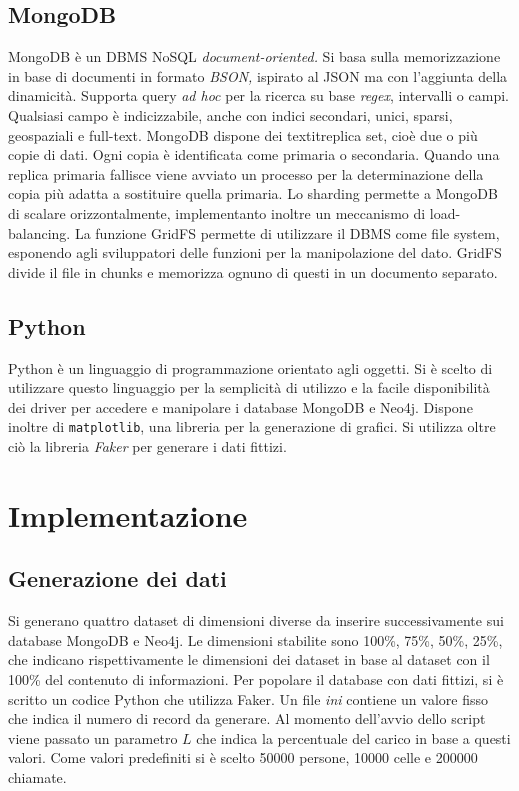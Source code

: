     \vfill

    \subsection{MongoDB}
    MongoDB è un DBMS NoSQL \textit{document-oriented.} Si basa sulla memorizzazione
    in base di documenti in formato \textit{BSON,} ispirato al JSON ma con l'aggiunta
    della dinamicità. Supporta query \textit{ad hoc} per la ricerca su base
    \textit{regex}, intervalli o campi. Qualsiasi campo è indicizzabile, anche
    con indici secondari, unici, sparsi, geospaziali e full-text. MongoDB dispone
    dei textit{replica set,} cioè due o più copie di dati. Ogni copia è identificata come
    primaria o secondaria. Quando una replica primaria fallisce viene avviato un processo
    per la determinazione della copia più adatta a sostituire quella primaria. Lo sharding
    permette a MongoDB di scalare orizzontalmente, implementanto inoltre un
    meccanismo di load-balancing. La funzione GridFS permette di utilizzare il DBMS come file system,
    esponendo agli sviluppatori delle funzioni per la manipolazione del dato. GridFS divide il file
    in chunks e memorizza ognuno di questi in un documento separato.  

    \pagebreak
    \subsection{Python}
    Python è un linguaggio di programmazione orientato agli oggetti. Si è scelto di utilizzare questo
    linguaggio per la semplicità di utilizzo e la facile disponibilità dei driver per accedere e manipolare
    i database MongoDB e Neo4j. Dispone inoltre di \texttt{matplotlib}, una libreria per
    la generazione di grafici. Si utilizza oltre ciò la libreria \textit{Faker} per generare i dati fittizi.

\section{Implementazione}

    \pagebreak
    \subsection{Generazione dei dati}
    Si generano quattro dataset di dimensioni diverse da inserire successivamente sui database
    MongoDB e Neo4j. Le dimensioni stabilite sono 100\%, 75\%, 50\%, 25\%, che indicano rispettivamente
    le dimensioni dei dataset in base al dataset con il 100\% del contenuto di informazioni.
    Per popolare il database con dati fittizi, si è scritto un codice Python che utilizza Faker.
    Un file \textit{ini} contiene un valore fisso che indica il numero di record da generare.
    Al momento dell'avvio dello script viene passato un parametro $L$ che indica la percentuale
    del carico in base a questi valori. 
    Come valori predefiniti si è scelto 50000 persone, 10000 celle e 200000 chiamate.

